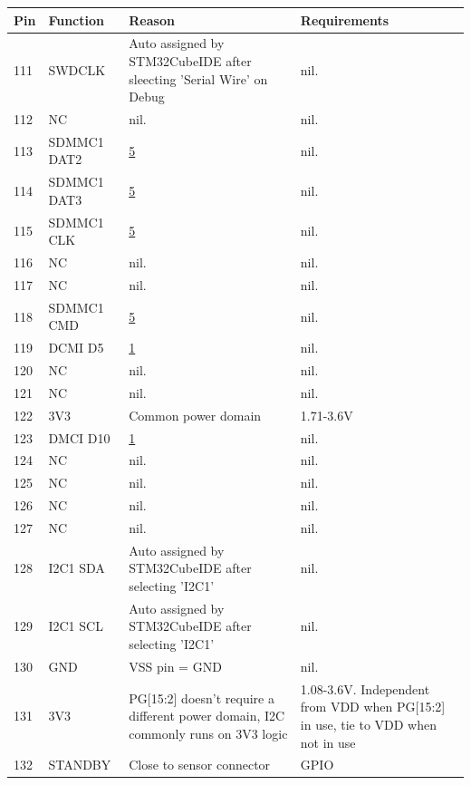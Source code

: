 \begin{table}[H]
    \ContinuedFloat
    \begin{tabular}{|l|p{3cm}|p{6.5cm}|p{3.5cm}|}
        \hline
        \textbf{Pin} & \textbf{Function} & \textbf{Reason} & \textbf{Requirements} \\
        \hline
        111 & SWDCLK & Auto assigned by STM32CubeIDE after sleecting 'Serial Wire' on Debug & nil. \\ \hline
        112 & NC & nil. & nil. \\ \hline
        113 & SDMMC1 DAT2 & \hyperlink{sdmmc1}{5} & nil. \\ \hline
        114 & SDMMC1 DAT3 & \hyperlink{sdmmc1}{5} & nil. \\ \hline
        115 & SDMMC1 CLK & \hyperlink{sdmmc1}{5} & nil. \\ \hline
        116 & NC & nil. & nil. \\ \hline
        117 & NC & nil. & nil. \\ \hline
        118 & SDMMC1 CMD & \hyperlink{sdmmc1}{5} & nil. \\ \hline
        119 & DCMI D5 & \hyperlink{dcmi-reason}{1} & nil. \\ \hline
        120 & NC & nil. & nil. \\ \hline
        121 & NC & nil. & nil. \\ \hline
        122 & 3V3 & Common power domain & 1.71-3.6V \\ \hline
        123 & DMCI D10 & \hyperlink{dcmi-reason}{1} & nil. \\ \hline
        124 & NC & nil. & nil. \\ \hline
        125 & NC & nil. & nil. \\ \hline
        126 & NC & nil. & nil. \\ \hline
        127 & NC & nil. & nil. \\ \hline
        128 & I2C1 SDA & Auto assigned by STM32CubeIDE after selecting 'I2C1' & nil. \\ \hline
        129 & I2C1 SCL & Auto assigned by STM32CubeIDE after selecting 'I2C1' & nil. \\ \hline
        130 & GND & VSS pin = GND & nil. \\ \hline
        131 & 3V3 & PG[15:2] doesn't require a different power domain, I2C commonly runs on 3V3 logic & 1.08-3.6V. Independent from VDD when PG[15:2] in use, tie to VDD when not in use \\ \hline
        132 & STANDBY & Close to sensor connector & GPIO \\ \hline

\end{tabular}
\end{table}
